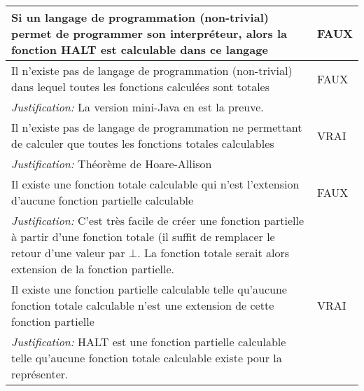 \begin{longtable}{p{13cm}|l}
    \hline
    Si un langage de programmation (non-trivial) permet de programmer son interpréteur, alors la fonction HALT est calculable dans ce langage & FAUX \\
    \hline
    Il n'existe pas de langage de programmation (non-trivial) dans lequel toutes les fonctions calculées sont totales & FAUX  \\
    \textit{Justification:} La version mini-Java en est la preuve. & \\
    \hline
    Il n'existe pas de langage de programmation ne permettant de calculer que toutes les fonctions totales calculables & VRAI\\
    \textit{Justification:} Théorème de Hoare-Allison & \\
    \hline
    Il existe une fonction totale calculable qui n'est l'extension d'aucune fonction partielle calculable & FAUX \\
    \textit{Justification:} C'est très facile de créer une fonction partielle à partir d'une fonction totale (il suffit de remplacer le retour d'une valeur par $\bot$. La fonction totale serait alors extension de la fonction partielle. & \\
    \hline
    Il existe une fonction partielle calculable telle qu'aucune fonction totale calculable n'est une extension de cette fonction partielle & VRAI \\
    \textit{Justification:} HALT est une fonction partielle calculable telle qu'aucune fonction totale calculable existe pour la représenter. & \\

\end{longtable}